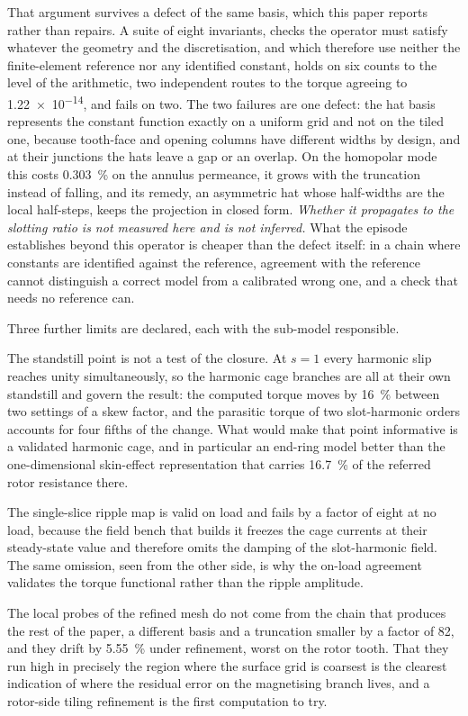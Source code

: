 \documentclass[10pt,a4paper,twocolumn]{article}
\theoremstyle{plain}
\theoremstyle{remark}
\begin{document}
That argument survives a defect of the same basis, which this paper
reports rather than repairs. A suite of eight invariants, checks the
operator must satisfy whatever the geometry and the discretisation, and
which therefore use neither the finite-element reference nor any
identified constant, holds on six counts to the level of the
arithmetic, two independent routes to the torque agreeing to
\num{1.22e-14}, and fails on two. The two failures are one defect: the
hat basis represents the constant function exactly on a uniform grid and
not on the tiled one, because tooth-face and opening columns have
different widths by design, and at their junctions the hats leave a gap
or an overlap. On the homopolar mode this costs \SI{0.303}{\percent} on
the annulus permeance, it grows with the truncation instead of falling,
and its remedy, an asymmetric hat whose half-widths are the local
half-steps, keeps the projection in closed form. \emph{Whether it
propagates to the slotting ratio is not measured here and is not
inferred.} What the episode establishes beyond this operator is cheaper
than the defect itself: in a chain where constants are identified against
the reference, agreement with the reference cannot distinguish a correct
model from a calibrated wrong one, and a check that needs no reference
can.

Three further limits are declared, each with the sub-model responsible.

The standstill point is not a test of the closure. At $s=1$ every
harmonic slip reaches unity simultaneously, so the harmonic cage
branches are all at their own standstill and govern the result: the
computed torque moves by \SI{16}{\percent} between two settings of a
skew factor, and the parasitic torque of two slot-harmonic orders
accounts for four fifths of the change. What would make that point
informative is a validated harmonic cage, and in particular an end-ring
model better than the one-dimensional skin-effect representation that
carries \SI{16.7}{\percent} of the referred rotor resistance there.

The single-slice ripple map is valid on load and fails by a factor of
eight at no load, because the field bench that builds it freezes the
cage currents at their steady-state value and therefore omits the
damping of the slot-harmonic field. The same omission, seen from the
other side, is why the on-load agreement validates the torque functional
rather than the ripple amplitude.

The local probes of the refined mesh do not come from the chain that
produces the rest of the paper, a different basis and a truncation
smaller by a factor of 82, and they drift by \SI{5.55}{\percent} under
refinement, worst on the rotor tooth. That they run high in precisely
the region where the surface grid is coarsest is the clearest indication
of where the residual error on the magnetising branch lives, and a
rotor-side tiling refinement is the first computation to try.
\end{document}
